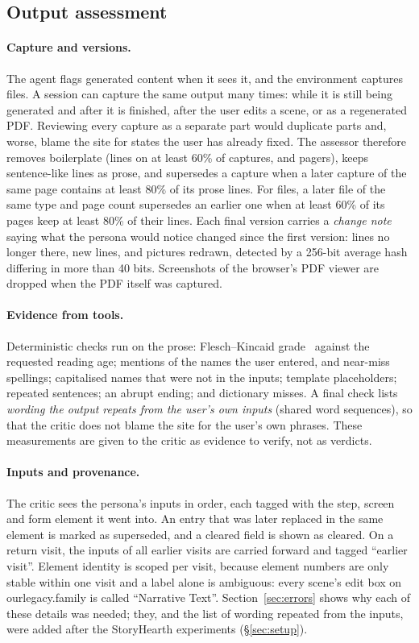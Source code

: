 \documentclass[10pt,twocolumn]{article}
\newcommand{\site}{StoryHearth}
\newcommand{\ol}{\textsf{ourlegacy.family}}
\begin{document}
\subsection{Output assessment}
\label{sec:output}

\paragraph{Capture and versions.} The agent flags generated content when it sees it, and the environment captures files. A session can capture the same output many times: while it is still being generated and after it is finished, after the user edits a scene, or as a regenerated PDF. Reviewing every capture as a separate part would duplicate parts and, worse, blame the site for states the user has already fixed. The assessor therefore removes boilerplate (lines on at least 60\% of captures, and pagers), keeps sentence-like lines as prose, and supersedes a capture when a later capture of the same page contains at least 80\% of its prose lines. For files, a later file of the same type and page count supersedes an earlier one when at least 60\% of its pages keep at least 80\% of their lines. Each final version carries a \emph{change note} saying what the persona would notice changed since the first version: lines no longer there, new lines, and pictures redrawn, detected by a 256-bit average hash differing in more than 40 bits. Screenshots of the browser's PDF viewer are dropped when the PDF itself was captured.

\paragraph{Evidence from tools.} Deterministic checks run on the prose: Flesch--Kincaid grade~\cite{kincaid1975derivation} against the requested reading age; mentions of the names the user entered, and near-miss spellings; capitalised names that were not in the inputs; template placeholders; repeated sentences; an abrupt ending; and dictionary misses. A final check lists \emph{wording the output repeats from the user's own inputs} (shared word sequences), so that the critic does not blame the site for the user's own phrases. These measurements are given to the critic as evidence to verify, not as verdicts.

\paragraph{Inputs and provenance.} The critic sees the persona's inputs in order, each tagged with the step, screen and form element it went into. An entry that was later replaced in the same element is marked as superseded, and a cleared field is shown as cleared. On a return visit, the inputs of all earlier visits are carried forward and tagged ``earlier visit''. Element identity is scoped per visit, because element numbers are only stable within one visit and a label alone is ambiguous: every scene's edit box on \ol{} is called ``Narrative Text''. Section~\ref{sec:errors} shows why each of these details was needed; they, and the list of wording repeated from the inputs, were added after the \site{} experiments (\S\ref{sec:setup}).
\end{document}
